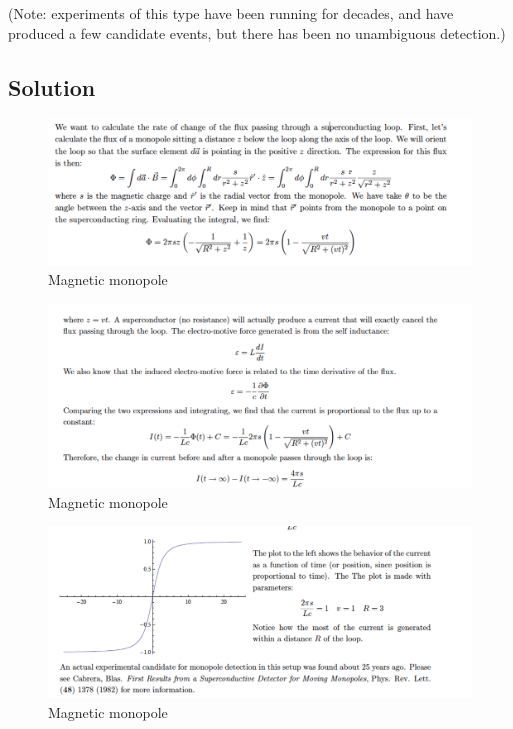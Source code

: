 \documentclass[solutions]{esg8022pset}
\begin{document}
  \noindent (Note: experiments of this type have been running for decades, and have produced a few candidate events, but there has been no unambiguous detection.)
\subsection{Solution}

 \begin{figure}[H]
    \centering
    \includegraphics[width = 15cm]{mono_sol_a}
    \caption{Magnetic monopole}
\end{figure}

 \begin{figure}[H]
    \centering
    \includegraphics[width = 15cm]{mono_sol_b}
    \caption{Magnetic monopole}
\end{figure}

 \begin{figure}[H]
    \centering
    \includegraphics[width = 15cm]{monopole_sol_c}
    \caption{Magnetic monopole}
   \end{figure}
\end{document}
